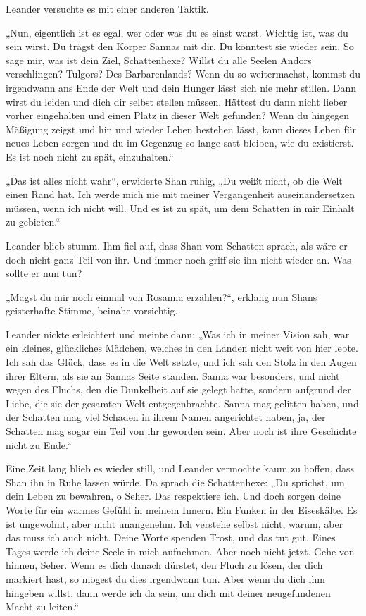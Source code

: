 \documentclass[10pt, a4paper, oneside]{book}
\begin{document}
Leander versuchte es mit einer anderen Taktik.

„Nun, eigentlich ist es egal, wer oder was du es einst warst. Wichtig ist, was du sein wirst. Du trägst den Körper Sannas mit dir. Du könntest sie wieder sein. So sage mir, was ist dein Ziel, Schattenhexe? Willst du alle Seelen Andors verschlingen? Tulgors? Des Barbarenlands? Wenn du so weitermachst, kommst du irgendwann ans Ende der Welt und dein Hunger lässt sich nie mehr stillen. Dann wirst du leiden und dich dir selbst stellen müssen. Hättest du dann nicht lieber vorher eingehalten und einen Platz in dieser Welt gefunden? Wenn du hingegen Mäßigung zeigst und hin und wieder Leben bestehen lässt, kann dieses Leben für neues Leben sorgen und du im Gegenzug so lange satt bleiben, wie du existierst. Es ist noch nicht zu spät, einzuhalten.“

„Das ist alles nicht wahr“, erwiderte Shan ruhig, „Du weißt nicht, ob die Welt einen Rand hat. Ich werde mich nie mit meiner Vergangenheit auseinandersetzen müssen, wenn ich nicht will. Und es ist zu spät, um dem Schatten in mir Einhalt zu gebieten.“

Leander blieb stumm. Ihm fiel auf, dass Shan vom Schatten sprach, als wäre er doch nicht ganz Teil von ihr. Und immer noch griff sie ihn nicht wieder an. Was sollte er nun tun?

„Magst du mir noch einmal von Rosanna erzählen?“, erklang nun Shans geisterhafte Stimme, beinahe vorsichtig.

Leander nickte erleichtert und meinte dann: „Was ich in meiner Vision sah, war ein kleines, glückliches Mädchen, welches in den Landen nicht weit von hier lebte. Ich sah das Glück, dass es in die Welt setzte, und ich sah den Stolz in den Augen ihrer Eltern, als sie an Sannas Seite standen. Sanna war besonders, und nicht wegen des Fluchs, den die Dunkelheit auf sie gelegt hatte, sondern aufgrund der Liebe, die sie der gesamten Welt entgegenbrachte. Sanna mag gelitten haben, und der Schatten mag viel Schaden in ihrem Namen angerichtet haben, ja, der Schatten mag sogar ein Teil von ihr geworden sein. Aber noch ist ihre Geschichte nicht zu Ende.“

Eine Zeit lang blieb es wieder still, und Leander vermochte kaum zu hoffen, dass Shan ihn in Ruhe lassen würde. Da sprach die Schattenhexe: „Du sprichst, um dein Leben zu bewahren, o Seher. Das respektiere ich. Und doch sorgen deine Worte für ein warmes Gefühl in meinem Innern. Ein Funken in der Eiseskälte. Es ist ungewohnt, aber nicht unangenehm. Ich verstehe selbst nicht, warum, aber das muss ich auch nicht. Deine Worte spenden Trost, und das tut gut. Eines Tages werde ich deine Seele in mich aufnehmen. Aber noch nicht jetzt. Gehe von hinnen, Seher. Wenn es dich danach dürstet, den Fluch zu lösen, der dich markiert hast, so mögest du dies irgendwann tun. Aber wenn du dich ihm hingeben willst, dann werde ich da sein, um dich mit deiner neugefundenen Macht zu leiten.“
\end{document}
